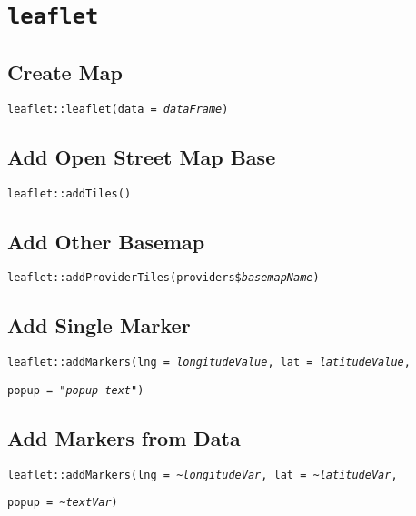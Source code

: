 \documentclass{tufte-handout}
\newenvironment{subs}
  {\adjustwidth{3em}{0pt}}
  {\endadjustwidth}
\begin{document}
\section{\texttt{leaflet}}
\begin{subs}
\subsection{Create Map}
\texttt{leaflet::}{\color{red}\texttt{leaflet}}\texttt{(data = \textit{dataFrame})}

\vspace{3mm}
\subsection{Add Open Street Map Base}
\texttt{leaflet::}{\color{red}\texttt{addTiles}}\texttt{()}

\vspace{3mm}
\subsection{Add Other Basemap}
\texttt{leaflet::}{\color{red}\texttt{addProviderTiles}}\texttt{(providers\$\textit{basemapName})}

\vspace{3mm}
\subsection{Add Single Marker}
\texttt{leaflet::}{\color{red}\texttt{addMarkers}}\texttt{(lng = \textit{longitudeValue}, lat = \textit{latitudeValue},}
\par \texttt{popup = "\textit{popup text}")}

\vspace{3mm}
\subsection{Add Markers from Data}
\texttt{leaflet::}{\color{red}\texttt{addMarkers}}\texttt{(lng = \textasciitilde\textit{longitudeVar}, lat = \textasciitilde\textit{latitudeVar},}
\par \texttt{popup = \textasciitilde\textit{textVar})}

\end{subs}

\end{document}
